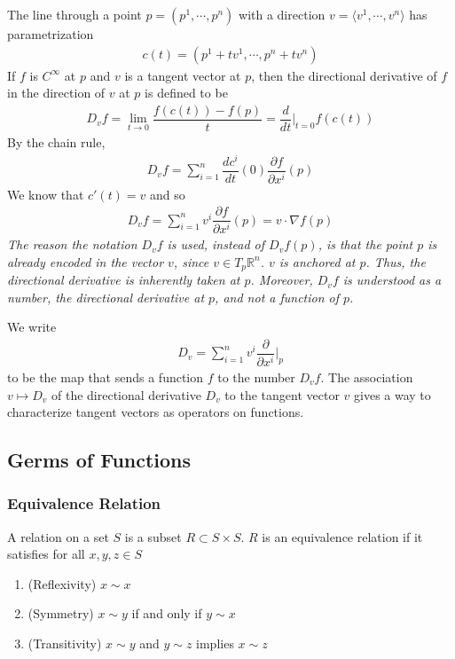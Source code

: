 \documentclass{article}
\newcommand{\R}{\mathbb{R}}
\begin{document}
	The line through a point $p = \left( p^1, \cdots, p^n \right)$ with a direction $v = \langle v^1, \cdots, v^n \rangle$ has parametrization
	\begin{gather*}
		c(t) = \left( p^1 + t v^1, \cdots, p^n + t v^n \right)
	\end{gather*}
	If $f$ is $C^{\infty}$ at $p$ and $v$ is a tangent vector at $p$, then the directional derivative of $f$ in the direction of $v$ at $p$ is defined to be
	\begin{gather*}
		D_v f = \lim_{t \to 0} \dfrac{f(c(t)) - f(p)}{t} = \dfrac{d}{dt} \Bigg|_{t = 0} f(c(t))
	\end{gather*}
	By the chain rule,
	\begin{gather*}
		D_v f = \sum_{i = 1}^n \dfrac{dc^i}{dt}(0) \dfrac{\partial f}{\partial x^i}(p)
	\end{gather*}
	We know that $c'(t) = v$ and so
	\begin{gather*}
		D_v f = \sum_{i = 1}^n v^i \dfrac{\partial f}{\partial x^i}(p) = v \cdot \nabla f(p)
	\end{gather*}
	\textit{The reason the notation $D_v f$ is used, instead of $D_v f(p)$, is that the point $p$ is already encoded in the vector $v$, since $v \in T_p \R^n$. $v$ is anchored at $p$. Thus, the directional derivative is inherently taken at $p$. Moreover, $D_v f$ is understood as a number, the directional derivative at $p$, and not a function of $p$.}
	
	We write
	\begin{gather*}
		D_v = \sum_{i = 1}^n v^i \dfrac{\partial}{\partial x^i} \Bigg|_p
	\end{gather*}
	to be the map that sends a function $f$ to the number $D_v f$. The association $v \mapsto D_v$ of the directional derivative $D_v$ to the tangent vector $v$ gives a way to characterize tangent vectors as operators on functions.
	
	
	\subsection*{Germs of Functions}
	
	\subsubsection*{Equivalence Relation}
	A relation on a set $S$ is a subset $R \subset S \times S$. $R$ is an equivalence relation if it satisfies for all $x, y, z \in S$
	\begin{enumerate}
		\item (Reflexivity) $x \sim x$
		\item (Symmetry) $x \sim y$ if and only if $y \sim x$
		\item (Transitivity) $x \sim y$ and $y \sim z$ implies $x \sim z$
	\end{enumerate}
	
\end{document}
